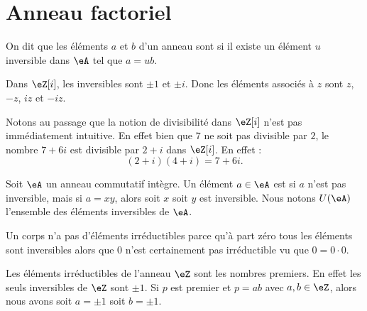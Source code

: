 \section{Anneau factoriel}

\begin{definition}  \label{DefrXUixs}
    On dit que les éléments \( a\) et \( b\) d'un anneau sont  si il existe un élément \( u\) inversible dans \( \eA\) tel que \( a=ub\).
\end{definition}

\begin{example}
    Dans \( \eZ[i]\), les inversibles sont \( \pm 1\) et \( \pm i\). Donc les éléments associés à \( z\) sont \( z\), \( -z\), \( iz\) et \( -iz\).

    Notons au passage que la notion de divisibilité dans \( \eZ[i]\) n'est pas immédiatement intuitive. En effet bien que \( 7\) ne soit pas divisible par \( 2\), le nombre \( 7+6i\) est divisible par \( 2+i\) dans \( \eZ[i]\). En effet :
    \begin{equation}
        (2+i)(4+i)=7+6i.
    \end{equation}
\end{example}

\begin{definition}  \label{DeirredBDhQfA}
    Soit \( \eA\) un anneau commutatif intègre. Un élément \( a\in\eA\) est  si \( a\) n'est pas inversible, mais si \( a=xy\), alors soit \( x\) soit \( y\) est inversible. Nous notons \( U(\eA)\) l'ensemble des éléments inversibles de \( \eA\).
\end{definition}

\begin{remark}
    Un corps n'a pas d'éléments irréductibles parce qu'à part zéro tous les éléments sont inversibles alors que \( 0\) n'est certainement pas irréductible vu que \( 0=0\cdot 0\).
\end{remark}

\begin{example}
    Les éléments irréductibles de l'anneau \( \eZ\) sont les nombres premiers. En effet les seuls inversibles de \( \eZ\) sont \( \pm 1\). Si \( p\) est premier et \( p=ab\) avec \( a,b\in \eZ\), alors nous avons soit \( a=\pm 1\) soit \( b=\pm 1\).
\end{example}

